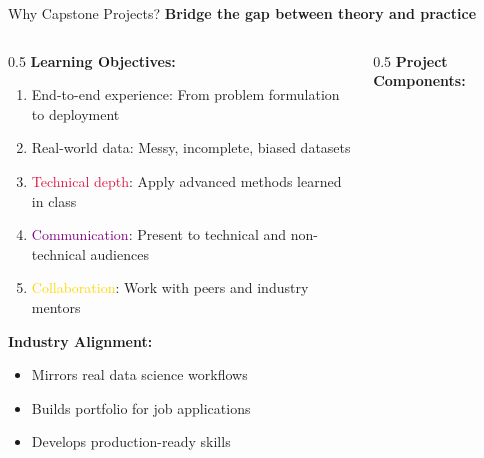 \begin{frame}{Why Capstone Projects?}
\textbf{Bridge the gap between theory and practice}

\begin{columns}
\begin{column}{0.5\textwidth}
\textbf{Learning Objectives:}
\begin{enumerate}
\item \textcolor{forest}{End-to-end experience}: From problem formulation to deployment
\item \textcolor{navyblue}{Real-world data}: Messy, incomplete, biased datasets
\item \textcolor{crimson}{Technical depth}: Apply advanced methods learned in class
\item \textcolor{purple}{Communication}: Present to technical and non-technical audiences
\item \textcolor{gold}{Collaboration}: Work with peers and industry mentors
\end{enumerate}

\vspace{0.3cm}
\textbf{Industry Alignment:}
\begin{itemize}
\item Mirrors real data science workflows
\item Builds portfolio for job applications
\item Develops production-ready skills
\end{itemize}
\end{column}

\begin{column}{0.5\textwidth}
\textbf{Project Components:}

\begin{figure}
\centering
{}
\end{figure}
\end{column}
\end{columns}
\end{frame}
